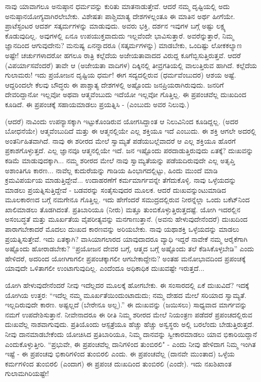 ನಾವು ಯಾವಾಗಲೂ ಅನುಷ್ಠಾನ ಧರ್ಮವನ್ನು ಕುರಿತು ಮಾತನಾಡುತ್ತೇವೆ. ಆದರೆ ನಮ್ಮ ದೃಷ್ಟಿಯಲ್ಲಿ ಅದು ಅನುಷ್ಠಾನಯೋಗ್ಯವಾಗಿರಲೇಬೇಕು. ವಿಶೇಷತಃ ಪಾಶ್ಚಿಮಾತ್ಯ ದೇಶಗಳಲ್ಲಂತೂ ಈ ಮಾತಿನ ಅರ್ಥ ಹೀಗೆಯೇ. ಪ್ರಾಟೆಸ್ಟಂಟರ ಆದರ್ಶ ಸತ್ಕರ್ಮಗಳನ್ನು ಮಾಡುವುದು. ಅವರು ಭಕ್ತಿ, ದರ್ಶನ ಇವುಗಳ ಬಗ್ಗೆ ಅಷ್ಟು ಲಕ್ಷ್ಯ ಕೊಡುವುದಿಲ್ಲ. ಅವುಗಳಲ್ಲಿ ಏನೂ ಉಪಯುಕ್ತವಾದುದು ಇಲ್ಲವೆಂದೇ ಭಾವಿಸುತ್ತಾರೆ. ಅವರೆನ್ನುತ್ತಾರೆ, ನಿಮ್ಮ ಜ್ಞಾನದಿಂದ ಆಗುವುದೇನು? ಮನುಷ್ಯ ಏನನ್ನಾದರೂ (ಸತ್ಕರ್ಮಗಳನ್ನು) ಮಾಡಬೇಕು, ಒಂದಿಷ್ಟು ಲೋಕಕಲ್ಯಾಣ ಅಷ್ಟೇ! ಚರ್ಚುಗಳಾದರೋ ಹಗಲೂ ರಾತ್ರಿ ಕಲ್ಲೆದೆಯ ಅಜೇಯತಾವಾದದ ವಿರುದ್ದ ಕೂಗೆಬ್ಬಿಸುತ್ತಿರುತ್ತವೆ. ಆದರೆ \break (ವಿಪರ್ಯಾಸವೆಂದರೆ) ತಾವೇ ಆ (ಅಜೇಯತಾ ವಾದಿಗಳ) ದಿಕ್ಕಿನಲ್ಲಿ ತೀವ್ರಗತಿಯಲ್ಲಿ ವಾಲುತ್ತಿರುವ ಹಾಗಿದೆ. ಕಲ್ಲೆದೆಯ ಗುಲಾಮರು! ಇದು ಪ್ರಯೋಜನ ದೃಷ್ಟಿಯ ಧರ್ಮ! ಈಗ ಸದ್ಯದಲ್ಲಿರುವ (ಧರ್ಮವೆಂಬುದರ) ಆಶಯ ಅಷ್ಟೆ. ಆದ್ದರಿಂದಲೇ ಕೆಲವು ಬೌದ್ಧರು ಈ ಪಾಶ್ಚಾತ್ಯ ದೇಶಗಳಲ್ಲಿ ಅಷ್ಟೊಂದು ಜನಪ್ರಿಯರಾಗಿರುವುದು. ಜನರಿಗೆ ದೇವರಿದ್ದಾನೋ ಇಲ್ಲವೋ ಅಥವಾ ಆತ್ಮವೆಂಬುದು ಇದೆಯೋ ಇಲ್ಲವೋ ಗೊತ್ತಿಲ್ಲ. ಈ ಪ್ರಪಂಚವೆಲ್ಲ ದುಃಖದಿಂದ ಕೂಡಿದೆ. ಈ ಪ್ರಪಂಚಕ್ಕೆ ಸಹಾಯಮಾಡಲು ಪ್ರಯತ್ನಿಸಿ - (ಎಂಬುದು ಅವರ ನಿಲುವು.)

(ಆದರೆ) ನಾವಿಂದು ಉಪನ್ಯಾಸಕ್ಕಾಗಿ ಇಟ್ಟುಕೊಂಡಿರುವ ಯೋಗಸಿದ್ದಾಂತ ಆ ನಿಲುವಿನಿಂದ ಕೂಡಿದ್ದಲ್ಲ. (ಅದರ ಬೋಧನೆಯೇ) ಆತ್ಮವೆಂಬುದಿದೆ ಮತ್ತು ಈ ಆತ್ಮನಲ್ಲಿಯೇ ಎಲ್ಲ ಶಕ್ತಿಯೂ ಇದೆ ಎಂಬುದು. ಈ ಶಕ್ತಿ ಆಗಲೇ ಅದರಲ್ಲಿ ಅಂತರ್ನಿಹಿತವಾಗಿದೆ. ನಾವು ಈ ಶರೀರದ ಮೇಲೆ ಸ್ವಾಮ್ಯತೆ ಪಡೆಯಬಲ್ಲೆವಾದರೆ ಆ ಎಲ್ಲ ಶಕ್ತಿಯೂ ಹೊರಗೆ ಪ್ರಕಾಶಗೊಳ್ಳುತ್ತದೆ. ಎಲ್ಲ ಜ್ಞಾನವೂ ಆತ್ಮನಲ್ಲಿಯೇ ಇದೆ. ಜನ ಇಷ್ಟೊಂದು ಪರದಾಡುತ್ತಿರುವುದು ಏತಕ್ಕೆ? ದುಃಖವನ್ನು ಕಡಿಮೆ ಮಾಡುವುದಕ್ಕಾಗಿ... ನಮ್ಮ ಶರೀರದ ಮೇಲೆ ನಾವು ಸ್ವಾಮ್ಯತೆಯನ್ನು ಪಡೆಯದಿರುವುದೇ ಎಲ್ಲ ಅತೃಪ್ತಿ ಅಶಾಂತಿಗೂ ಕಾರಣ... ನಾವೆಲ್ಲ ಕುದುರೆಯನ್ನು ಗಾಡಿಯ ಹಿಂಭಾಗದಲ್ಲಿಟ್ಟು, ಹಿಂದು ಮುಂದೆ ಮಾಡಿ ಕ್ರಮವಿಪರ್ಯಯ ಮಾಡುತ್ತಿದ್ದೇವೆ... ಉದಾಹರಣೆಗೆ ಕರ್ಮಮಾರ್ಗವನ್ನೇ ತೆಗೆದುಕೊಳ್ಳಿ. ನಾವು ಒಳ್ಳೆಯದನ್ನು ಮಾಡಲು ಪ್ರಯತ್ನಿಸುತ್ತಿದ್ದೇವೆ - ಬಡವರನ್ನು ಸಂತೈಸುವುದರ ಮೂಲಕ. ಆದರೆ ದುಃಖವನ್ನುಂಟುಮಾಡಿದ ಮೂಲಕಾರಣದ ಬಗ್ಗೆ ನಮಗೇನೂ ಗೊತ್ತಿಲ್ಲ. ಇದು ಹೇಗೆಂದರೆ ಸಮುದ್ರದಲ್ಲಿರುವ ನೀರನ್ನೆಲ್ಲಾ ಒಂದು ಬಕೆಟ್‌ನಿಂದ ಖಾಲಿಮಾಡಲು ತೊಡಗಿದಂತೆ. ಪ್ರತಿಬಾರಿಯೂ (ನೀರು) ಮತ್ತೂ ತುಂಬಿಕೊಳ್ಳುತ್ತಿರುತ್ತದಷ್ಟೆ. ಯೋಗಿ ಇದರಲ್ಲಿನ ಅಸಂಬದ್ಧತೆ ಮತ್ತು ಮೂರ್ಖತೆಯ ವೈಪರೀತ್ಯವನ್ನು ಮನಗಾಣುತ್ತಾನೆ. (ಅವನು ಹೇಳುವುದೇನೆಂದರೆ) ದುಃಖದಿಂದ ಪಾರಾಗಬೇಕಾದರೆ ಮೊದಲು ದುಃಖದ ಕಾರಣವನ್ನು ಅರಿಯಬೇಕು. ನಾವು ಯಥಾಶಕ್ತಿ ಒಳ್ಳೆಯದನ್ನು ಮಾಡಲು ಪ್ರಯತ್ನಿಸುತ್ತೇವೆ. ಇದು ಏತಕ್ಕಾಗಿ? ವಾಸಿಯಾಗಲಾರದ ಯಾವುದಾದರೂ ವ್ಯಾಧಿ ಇದ್ದರೆ ನಾವೇಕೆ ನಮ್ಮ ಆರೈಕೆಗಾಗಿ ಅಷ್ಟೊಂದು ಹೋರಾಡಬೇಕು? “ಪ್ರಯೋಜನ ದೇವರ ಬಗ್ಗೆ, ಆತ್ಮದ ಬಗ್ಗೆ ಅಷ್ಟೊಂದು ತಲೆ ಕೆಡಿಸಿಕೊಳ್ಳಬೇಡಿ'' ಎಂದು ಹೇಳಿದರೆ, ಅದರಿಂದ ಯೋಗಿಗಾಗಲೀ ಪ್ರಪಂಚಕ್ಕಾಗಲೀ ಆಗಬೇಕಾದ್ದೇನು? ಅಂತಹ ಮನೋಭಾವದಿಂದ ಪ್ರಪಂಚಕ್ಕೆ ಯಾವುದೇ ಒಳಿತಾಗಲೀ ಉಂಟಾಗುವುದಿಲ್ಲ. ಎಂದೆಂದೂ ಅಧಿಕಾಧಿಕ ದುಃಖವಷ್ಟೇ ಇರುತ್ತದೆ...

ಯೋಗಿ ಹೇಳುವುದೇನೆಂದರೆ ನೀವು ಇದೆಲ್ಲದರ ಮೂಲಕ್ಕೆ ಹೋಗಬೇಕು. ಈ ಸಂಸಾರದಲ್ಲಿ ಏಕೆ ದುಃಖವಿದೆ? ಇದಕ್ಕೆ ಯೋಗಿಯ ಉತ್ತರ: “ಇದೆಲ್ಲ ನಮ್ಮ ಮೂರ್ಖತೆಯಿಂದುಂಟಾದುದು; ನಮ್ಮ ದೇಹದ ಮೇಲೆ ಸರಿಯಾದ ಸ್ವಾಮ್ಯತೆ. ಇಲ್ಲದಿರುವುದೇ ಕಾರಣ. ಅಷ್ಟಲ್ಲದೆ (ಬೇರೇನೂ ಅಲ್ಲ).” ಈ ದುಃಖವನ್ನು (ಜಯಿಸಲು) ಸಾಧ್ಯವಾದ ಮಾರ್ಗವನ್ನು ನಮಗೆ ಉಪದೇಶಿಸುತ್ತಾನೆ. ನೀವೇನಾದರೂ ಈ ರೀತಿ ನಿಮ್ಮ ಶರೀರದ ಮೇಲೆ ನಿಯಂತ್ರಣ ಪಡೆದರೆ ಪ್ರಪಂಚದಲ್ಲಿರುವ ದುಃಖವೆಲ್ಲ ನಾಶವಾಗುವುದು. ಪ್ರತಿಯೊಂದು ಆಸ್ಪತ್ರೆಯೂ ಹೆಚ್ಚು ಹೆಚ್ಚು ಅಸ್ವಸ್ಥರು ಅಲ್ಲಿ ಬರಲೆಂದು ಬೇಡುತ್ತಿರುತ್ತದೆ. ನೀವು ದಾನಮಾಡಬೇಕೆಂದು ಯೋಚಿಸಿದ ಪ್ರತಿಬಾರಿಯೂ, ನಿಮ್ಮ ದಾನವನ್ನು ಸ್ವೀಕಾರಮಾಡಲು ಯಾವ ಭಿಕಾರಿಯಿದ್ದಾನೆ ಎಂದುಕೊಳ್ಳುತ್ತೀರಿ. “ಪ್ರಭುವೇ, ಈ ಪ್ರಪಂಚವೆಲ್ಲ ದಾನಿಗಳಿಂದ ತುಂಬಿರಲಿ" - ಎಂದು ನೀವು ಹೇಳಿದಾಗ ನಿಮ್ಮ ಇಂಗಿತ ಇಷ್ಟೆ - ಈ ಪ್ರಪಂಚವು ಭಿಕಾರಿಗಳಿಂದ ತುಂಬಿರಲಿ ಎಂದು. ಈ ಪ್ರಪಂಚವೆಲ್ಲ (ದಾನವೇ ಮುಂತಾದ) ಒಳ್ಳೆಯ ಕರ್ಮಗಳಿಂದ ತುಂಬಿರಲಿ (ಎಂದಾಗ) ಈ ಪ್ರಪಂಚ ದುಃಖದಿಂದ ತುಂಬಿರಲಿ (ಎಂದೇ). ಇದು ನಖಶಿಖಾಂತ ಗುಲಾಮಗಿರಿಯಷ್ಟೇ!

